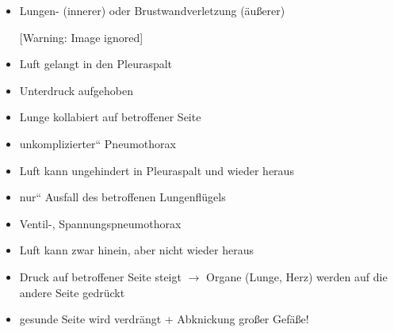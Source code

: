 \documentclass{article}
\begin{document}
\begin{itemize}
\item Lungen- (innerer) oder  Brustwandverletzung (\"au{\ss}erer)

\begin{center}
 [Warning: Image ignored] %

\end{center}
\end{itemize}
\begin{itemize}
\item Luft gelangt in den Pleuraspalt

\item Unterdruck aufgehoben

\item Lunge kollabiert auf betroffener Seite

\end{itemize}
\begin{itemize}
\item {\quotedblbase}unkomplizierter{\textquotedblleft} Pneumothorax

\end{itemize}
\begin{itemize}
\item Luft kann ungehindert in Pleuraspalt und  wieder heraus

\item {\quotedblbase}nur{\textquotedblleft} Ausfall des betroffenen
Lungenfl\"ugels

\end{itemize}
\begin{itemize}
\item Ventil-, Spannungspneumothorax

\end{itemize}
\begin{itemize}
\item Luft kann zwar hinein, aber nicht wieder  heraus

\item Druck auf betroffener Seite steigt ${\rightarrow}$  Organe (Lunge,
Herz) werden auf die andere Seite gedr\"uckt

\end{itemize}
\begin{itemize}
\item gesunde Seite wird verdr\"angt + Abknickung  gro{\ss}er
Gef\"a{\ss}e!

\end{itemize}
\end{document}
